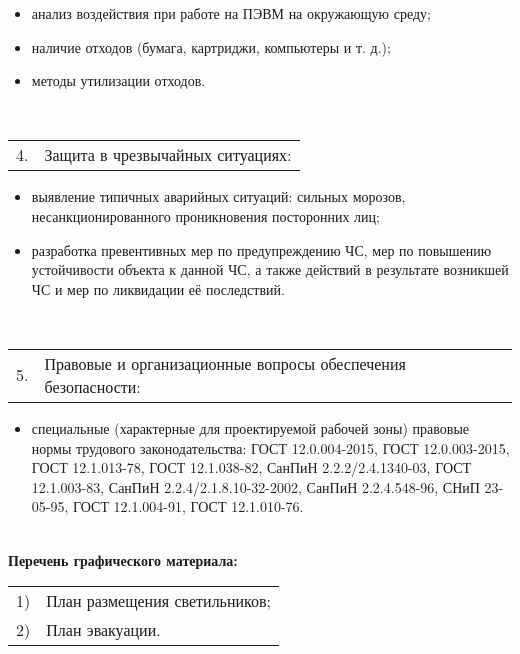 \begin{longtable}
\begin{itshape}
\begin{itemize}[leftmargin=1.2cm,topsep=-1ex,labelsep=0pt,labelwidth=0.5cm,after=\vspace{-\baselineskip}]
    \item анализ воздействия при работе на ПЭВМ на окружающую среду;
    \item наличие отходов (бумага, картриджи, компьютеры и т. д.);
    \item методы утилизации отходов.
\end{itemize}
\end{itshape}
\\ \hline
\begin{itshape}
\begin{tabular}{p{0.2cm}p{\hsize-0.7cm}}
4. & Защита в чрезвычайных ситуациях:
\end{tabular}
\begin{itemize}[leftmargin=1.2cm,topsep=-1ex,labelsep=0pt,labelwidth=0.5cm,after=\vspace{-\baselineskip}]
    \item выявление типичных аварийных ситуаций: сильных морозов, несанкционированного проникновения посторонних лиц;
    \item разработка превентивных мер по предупреждению ЧС, мер по повышению устойчивости объекта к данной ЧС, а также действий в результате возникшей ЧС и мер по ликвидации её последствий.
\end{itemize}
\end{itshape}
\\ \hline
\begin{itshape}
\begin{tabular}{p{0.2cm}p{\hsize-0.7cm}}
5. & Правовые и организационные вопросы обеспечения безопасности:
\end{tabular}
\begin{itemize}[leftmargin=1.2cm,topsep=-1ex,labelsep=0pt,labelwidth=0.5cm,after=\vspace{-\baselineskip}]
    \item специальные (характерные для проектируемой рабочей зоны) правовые нормы трудового законодательства: 
    ГОСТ 12.0.004-2015, ГОСТ 12.0.003-2015, ГОСТ 12.1.013-78, ГОСТ 12.1.038-82, СанПиН 2.2.2/2.4.1340-03, ГОСТ 12.1.003-83, СанПиН 2.2.4/2.1.8.10-32-2002, СанПиН 2.2.4.548-96, СНиП 23-05-95, ГОСТ 12.1.004-91, ГОСТ 12.1.010-76.
\end{itemize}
\end{itshape}
\\ \hline
\textbf{Перечень графического материала:}
\\ \hline
\begin{itshape}
\begin{tabular}{p{0.2cm}p{\hsize-0.7cm}}
1) & План размещения светильников; \\
2) & План эвакуации.
\end{tabular}
\end{itshape}
\\ \hline
\end{longtable}

